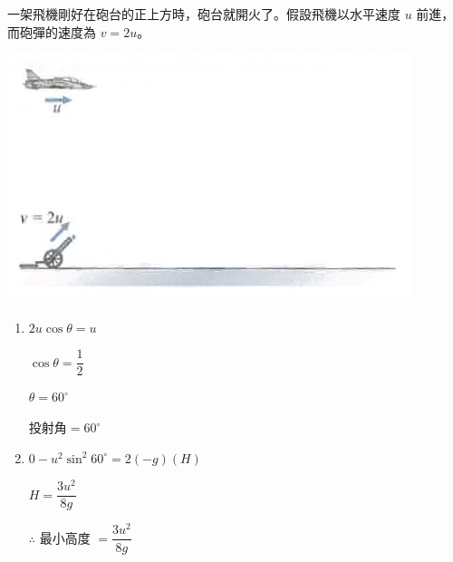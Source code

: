 {
一架飛機剛好在砲台的正上方時，砲台就開火了。假設飛機以水平速度 $u$ 前進，而砲彈的速度為 $v = 2u$。
{\par\centering
\includegraphics[width=.4\textwidth]{assets/565f9fec.png}
\par}
}{
\begin{enumerate}
    \item
          $2u\cos\theta=u$\giveM\par
          $\cos\theta=\dfrac{1}{2}$\par
          $\theta=60^\circ$\par
          投射角$=60^\circ$\giveA
    \item $0-u^2\sin^2 60^\circ=2(-g)(H)$\giveM\par
          $H=\dfrac{3u^2}{8g}$\par
          $\therefore$ 最小高度 $=\dfrac{3u^2}{8g}$\giveA
\end{enumerate}

}


